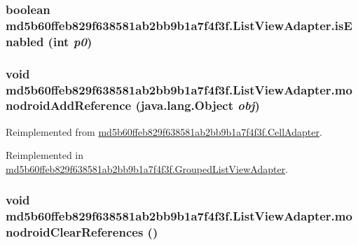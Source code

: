 \hypertarget{classmd5b60ffeb829f638581ab2bb9b1a7f4f3f_1_1_list_view_adapter_15dc86c11acd1d564985b671571b2d78}{
\subsubsection[{isEnabled}]{\setlength{\rightskip}{0pt plus 5cm}boolean md5b60ffeb829f638581ab2bb9b1a7f4f3f.ListViewAdapter.isEnabled (int {\em p0})}}
\label{classmd5b60ffeb829f638581ab2bb9b1a7f4f3f_1_1_list_view_adapter_15dc86c11acd1d564985b671571b2d78}


\hypertarget{classmd5b60ffeb829f638581ab2bb9b1a7f4f3f_1_1_list_view_adapter_1325a463fbf8e693412780668a9e9a7e}{
\subsubsection[{monodroidAddReference}]{\setlength{\rightskip}{0pt plus 5cm}void md5b60ffeb829f638581ab2bb9b1a7f4f3f.ListViewAdapter.monodroidAddReference (java.lang.Object {\em obj})}}
\label{classmd5b60ffeb829f638581ab2bb9b1a7f4f3f_1_1_list_view_adapter_1325a463fbf8e693412780668a9e9a7e}




Reimplemented from \hyperlink{classmd5b60ffeb829f638581ab2bb9b1a7f4f3f_1_1_cell_adapter_59b12b00e8c034309892498bbef078d4}{md5b60ffeb829f638581ab2bb9b1a7f4f3f.CellAdapter}.

Reimplemented in \hyperlink{classmd5b60ffeb829f638581ab2bb9b1a7f4f3f_1_1_grouped_list_view_adapter_dbd6d6284566d262ab2a3d9a44e0f906}{md5b60ffeb829f638581ab2bb9b1a7f4f3f.GroupedListViewAdapter}.\hypertarget{classmd5b60ffeb829f638581ab2bb9b1a7f4f3f_1_1_list_view_adapter_92941f5776f2c562a319f8c0cce9f2a4}{
\subsubsection[{monodroidClearReferences}]{\setlength{\rightskip}{0pt plus 5cm}void md5b60ffeb829f638581ab2bb9b1a7f4f3f.ListViewAdapter.monodroidClearReferences ()}}
\label{classmd5b60ffeb829f638581ab2bb9b1a7f4f3f_1_1_list_view_adapter_92941f5776f2c562a319f8c0cce9f2a4}





